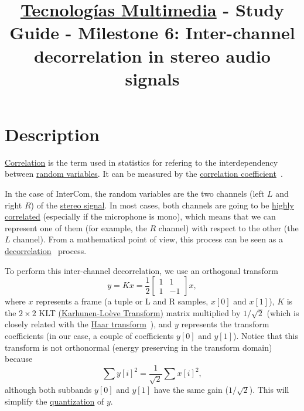 \title{\href{https://www.ual.es/estudios/grados/presentacion/plandeestudios/asignatura/4015/40154321?idioma=zh_CN}{Tecnologías Multimedia} - Study Guide - Milestone 6: Inter-channel decorrelation in stereo audio signals}

\maketitle

\section{Description}

\href{https://en.wikipedia.org/wiki/Correlation_and_dependence}{Correlation}
is the term used in statistics for refering to the interdependency
between \href{https://en.wikipedia.org/wiki/Random_variable}{random
  variables}. It can be measured by the
\href{https://www.mathsisfun.com/data/correlation.html}{correlation
  coefficient}~\cite{thinkstats}.

In the case of InterCom, the random variables are the two channels
(left $L$ and right $R$) of the
\href{https://en.wikipedia.org/wiki/Stereophonic_sound}{stereo
  signal}. In most cases, both channels are going to be
\href{https://en.wikipedia.org/wiki/Binaural_recording}{highly
  correlated} (especially if the microphone is mono), which means that
we can represent one of them (for example, the $R$ channel) with
respect to the other (the $L$ channel). From a mathematical point
of view, this process can be seen as a
\href{https://en.wikipedia.org/wiki/Decorrelation}{decorrelation}~\cite{sayood2017introduction}
process.

To perform this inter-channel decorrelation, we use an orthogonal
transform
\begin{equation}
  y = Kx = \frac{1}{2}\begin{bmatrix} 1 & 1 \\ 1 & -1 \end{bmatrix}x,
\end{equation}
where $x$ represents a frame (a tuple or L and R samples, $x[0]$ and
$x[1]$), $K$ is the $2\times 2$ KLT
\href{http://fourier.eng.hmc.edu/e161/lectures/klt/node3.html}{(Karhunen-Lo\`eve
  Transform)} matrix multiplied by $1/\sqrt{2}$ (which is closely
related with the \href{http://wavelets.pybytes.com/wavelet/haar/}{Haar
  transform}~\cite{vetterli1995wavelets}), and $y$ represents the
transform coefficients (in our case, a couple of coefficients $y[0]$
and $y[1]$). Notice that this transform is not orthonormal (energy
preserving in the transform domain) because
\begin{equation}
  \sum y[i]^2 = \frac{1}{\sqrt{2}}\sum x[i]^2,
\end{equation}
although both subbands $y[0]$ and $y[1]$ have the same gain
($1/\sqrt{2}$). This will simplify the
\href{https://en.wikipedia.org/wiki/Quantization_(signal_processing)}{quantization}
of $y$.

